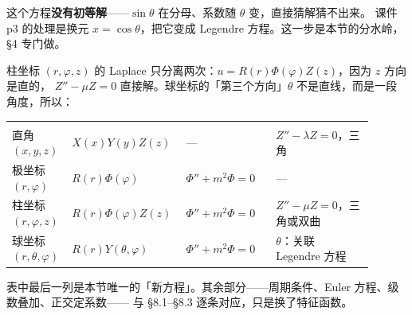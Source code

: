 这个方程\textbf{没有初等解}——$\sin\theta$ 在分母、系数随 $\theta$ 变，直接猜解猜不出来。
课件 p3 的处理是换元 $x=\cos\theta$，把它变成 Legendre 方程。这一步是本节的分水岭，
\S4 专门做。



柱坐标 $(r,\varphi,z)$ 的 Laplace 只分离两次：$u=R(r)\Phi(\varphi)Z(z)$，因为 $z$ 方向是直的，
$Z''-\mu Z=0$ 直接解。球坐标的「第三个方向」$\theta$ 不是直线，而是一段角度，所以：

\begin{center}
\tabtop
\begin{tabular}{@{}L{0.14\linewidth}L{0.26\linewidth}L{0.24\linewidth}L{0.26\linewidth}@{}}
 &  &  &  \\
\tabmidrule
直角 $(x,y,z)$ & $X(x)Y(y)Z(z)$ & — & $Z''-\lambda Z=0$，三角 \\
极坐标 $(r,\varphi)$ & $R(r)\Phi(\varphi)$ & $\Phi''+m^2\Phi=0$ & — \\
柱坐标 $(r,\varphi,z)$ & $R(r)\Phi(\varphi)Z(z)$ & $\Phi''+m^2\Phi=0$ & $Z''-\mu Z=0$，三角或双曲 \\
球坐标 $(r,\theta,\varphi)$ & $R(r)Y(\theta,\varphi)$ & $\Phi''+m^2\Phi=0$ & $\theta$：关联 Legendre 方程 \\
\end{tabular}
\tabbot
\end{center}

表中最后一列是本节唯一的「新方程」。其余部分——周期条件、Euler 方程、级数叠加、正交定系数——
与 §8.1--§8.3 逐条对应，只是换了特征函数。

\clearpage
